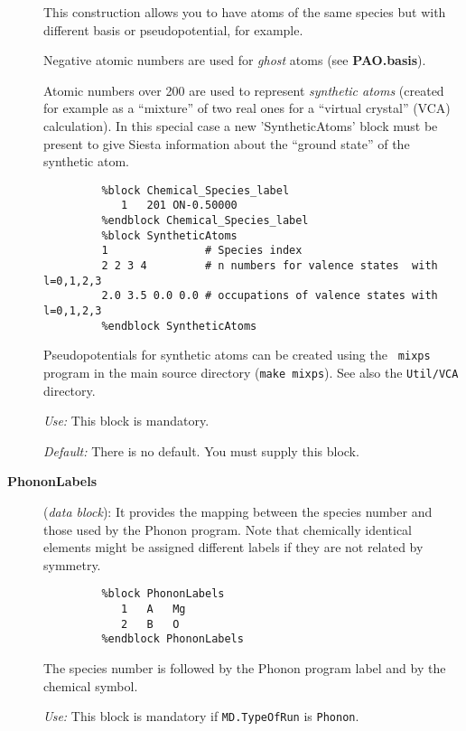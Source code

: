 \documentclass[11pt]{article}
\begin{document}
\begin{description}
This construction allows you to have atoms of the same species but with
different basis or pseudopotential, for example.

Negative atomic numbers are used for {\it ghost} atoms 
(see {\bf PAO.basis}).

Atomic numbers over 200 are used to represent {\it synthetic atoms}
 (created for example as a ``mixture'' of two
real ones for a ``virtual crystal'' (VCA) calculation). In
this special case a new 'SyntheticAtoms' block
  must be present to give
{\sc Siesta} information about the ``ground state'' of the synthetic
atom.

\begin{verbatim}
         %block Chemical_Species_label
            1   201 ON-0.50000
         %endblock Chemical_Species_label
         %block SyntheticAtoms
         1               # Species index
         2 2 3 4         # n numbers for valence states  with l=0,1,2,3
         2.0 3.5 0.0 0.0 # occupations of valence states with l=0,1,2,3
         %endblock SyntheticAtoms
\end{verbatim}

Pseudopotentials for synthetic atoms can be created using the {\tt
  mixps} program in the main source directory
  ({\tt make mixps}). See also the {\tt Util/VCA} directory.

{\it Use:} This block is mandatory.

{\it Default:} There is no default. You must supply this block.

\item[{\bf PhononLabels}] ({\it data block}): 
It provides the mapping 
between the species number and those used by the {\sc
Phonon} program. Note that chemically identical elements might be
assigned different labels if they are not related by symmetry.

\begin{verbatim}
         %block PhononLabels
            1   A   Mg
            2   B   O
         %endblock PhononLabels
\end{verbatim}

The species number is followed by the {\sc
Phonon} program label and by the chemical symbol.

{\it Use:} This block is mandatory if {\tt MD.TypeOfRun} is {\tt Phonon}.


\end{description}
\end{document}
